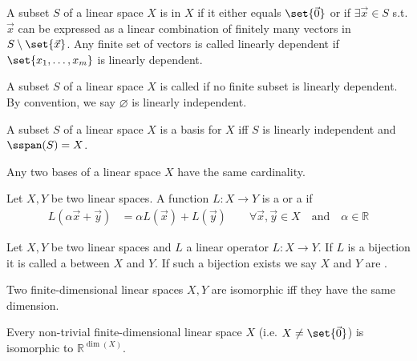 \documentclass{article}
\begin{document}
\begin{definition}
  A subset $S$ of a linear space $X$ is  in $X$ if it either equals $\set{\vec{0}}$ or if $\exists \vec{x} \in S$ s.t. $\vec{x}$ can be expressed as a linear combination of finitely many vectors in $S \setminus \set{\vec{x}}$. Any finite set of vectors is called linearly dependent if $\set{x_1, \ldots, x_m}$ is linearly dependent.
\end{definition}

\begin{definition}
  A subset $S$ of a linear space $X$ is called  if no finite subset is linearly dependent. By convention, we say $\varnothing$ is linearly independent.
\end{definition}

\begin{proposition}\label{proposition:linear_spaces_basis_independent}
  A subset $S$ of a linear space $X$ is a basis for $X$ iff $S$ is linearly independent and $\sspan(S) = X$.
\end{proposition}

\begin{corollary}
  Any two bases of a linear space $X$ have the same cardinality.
\end{corollary}

\begin{definition}
  Let $X, Y$ be two linear spaces. A function $L: X \to Y$ is a  or a  if
  \begin{align*}
    L(\alpha \vec{x} + \vec{y})
    &
    =
    \alpha L(\vec{x}) + L(\vec{y})
    \quad
    \quad
    \forall \vec{x}, \vec{y} \in X
    \quad
    \text{and}
    \quad
    \alpha \in \mathbb{R}
  \end{align*}
\end{definition}

\begin{definition}
  Let $X, Y$ be two linear spaces and $L$ a linear operator $L: X \to Y$. If $L$ is a bijection it is called a  between $X$ and $Y$. If such a bijection exists we say $X$ and $Y$ are .
\end{definition}

\begin{proposition}
  Two finite-dimensional linear spaces $X, Y$ are isomorphic iff they have the same dimension.
\end{proposition}

\begin{corollary}
  Every non-trivial finite-dimensional linear space $X$ (i.e. $X \ne \set{\vec{0}}$) is isomorphic to $\mathbb{R}^{\dim(X)}$.
\end{corollary}

\clearpage
\printindex

\end{document}
